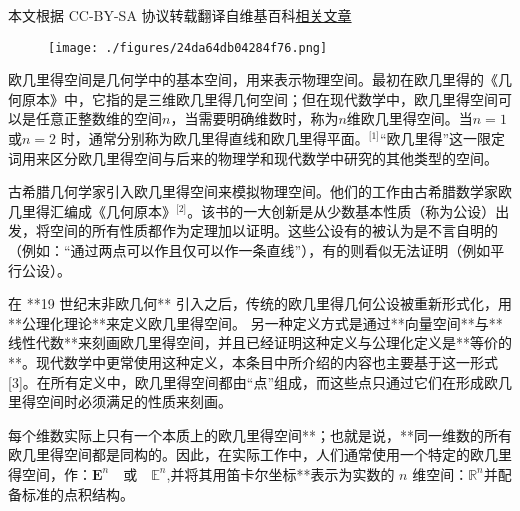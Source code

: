
本文根据 CC-BY-SA 协议转载翻译自维基百科\href{https://en.wikipedia.org/wiki/Euclidean_space}{相关文章}

\begin{figure}[ht]
\centering
\texttt{[image: ./figures/24da64db04284f76.png]}
\caption{} \label{fig_OJLDkj_1}
\end{figure}
欧几里得空间是几何学中的基本空间，用来表示物理空间。最初在欧几里得的《几何原本》中，它指的是三维欧几里得几何空间；但在现代数学中，欧几里得空间可以是任意正整数维的空间$n$，当需要明确维数时，称为$n$维欧几里得空间。当$n=1$或$n=2$ 时，通常分别称为欧几里得直线和欧几里得平面。\(^\text{[1]}\)“欧几里得”这一限定词用来区分欧几里得空间与后来的物理学和现代数学中研究的其他类型的空间。

古希腊几何学家引入欧几里得空间来模拟物理空间。他们的工作由古希腊数学家欧几里得汇编成《几何原本》\(^\text{[2]}\)。该书的一大创新是从少数基本性质（称为公设）出发，将空间的所有性质都作为定理加以证明。这些公设有的被认为是不言自明的（例如：“通过两点可以作且仅可以作一条直线”），有的则看似无法证明（例如平行公设）。

在 **19 世纪末非欧几何** 引入之后，传统的欧几里得几何公设被重新形式化，用**公理化理论**来定义欧几里得空间。
另一种定义方式是通过**向量空间**与**线性代数**来刻画欧几里得空间，并且已经证明这种定义与公理化定义是**等价的**。现代数学中更常使用这种定义，本条目中所介绍的内容也主要基于这一形式[3]。在所有定义中，欧几里得空间都由“点”组成，而这些点只通过它们在形成欧几里得空间时必须满足的性质来刻画。

每个维数实际上只有一个本质上的欧几里得空间**；也就是说，**同一维数的所有欧几里得空间都是同构的。因此，在实际工作中，人们通常使用一个特定的欧几里得空间，作：$\mathbf{E}^n \quad \text{或} \quad \mathbb{E}^n$,并将其用笛卡尔坐标**表示为实数的 $n$ 维空间：$\mathbb{R}^n$并配备标准的点积结构。

